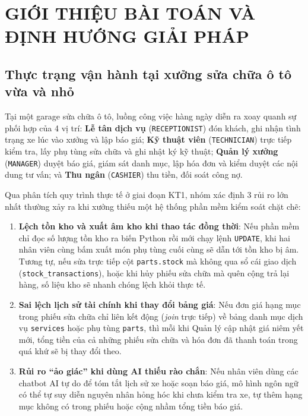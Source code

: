 \chapter{GIỚI THIỆU BÀI TOÁN VÀ ĐỊNH HƯỚNG GIẢI PHÁP}

\section{Thực trạng vận hành tại xưởng sửa chữa ô tô vừa và nhỏ}

Tại một garage sửa chữa ô tô, luồng công việc hàng ngày diễn ra xoay quanh sự phối hợp của 4 vị trí: \textbf{Lễ tân dịch vụ} (\texttt{RECEPTIONIST}) đón khách, ghi nhận tình trạng xe lúc vào xưởng và lập báo giá; \textbf{Kỹ thuật viên} (\texttt{TECHNICIAN}) trực tiếp kiểm tra, lấy phụ tùng sửa chữa và ghi nhật ký kỹ thuật; \textbf{Quản lý xưởng} (\texttt{MANAGER}) duyệt báo giá, giám sát danh mục, lập hóa đơn và kiểm duyệt các nội dung tư vấn; và \textbf{Thu ngân} (\texttt{CASHIER}) thu tiền, đối soát công nợ.

Qua phân tích quy trình thực tế ở giai đoạn KT1, nhóm xác định 3 rủi ro lớn nhất thường xảy ra khi xưởng thiếu một hệ thống phần mềm kiểm soát chặt chẽ:
\begin{enumerate}[noitemsep,topsep=2pt]
  \item \textbf{Lệch tồn kho và xuất âm kho khi thao tác đồng thời}: Nếu phần mềm chỉ đọc số lượng tồn kho ra biến Python rồi mới chạy lệnh \texttt{UPDATE}, khi hai nhân viên cùng bấm xuất món phụ tùng cuối cùng sẽ dẫn tới tồn kho bị âm. Tương tự, nếu sửa trực tiếp cột \texttt{parts.stock} mà không qua sổ cái giao dịch (\texttt{stock\_transactions}), hoặc khi hủy phiếu sửa chữa mà quên cộng trả lại hàng, số liệu kho sẽ nhanh chóng lệch khỏi thực tế.
  \item \textbf{Sai lệch lịch sử tài chính khi thay đổi bảng giá}: Nếu đơn giá hạng mục trong phiếu sửa chữa chỉ liên kết động (\textit{join} trực tiếp) về bảng danh mục dịch vụ \texttt{services} hoặc phụ tùng \texttt{parts}, thì mỗi khi Quản lý cập nhật giá niêm yết mới, tổng tiền của cả những phiếu sửa chữa và hóa đơn đã thanh toán trong quá khứ sẽ bị thay đổi theo.
  \item \textbf{Rủi ro “ảo giác” khi dùng AI thiếu rào chắn}: Nếu nhân viên dùng các chatbot AI tự do để tóm tắt lịch sử xe hoặc soạn báo giá, mô hình ngôn ngữ có thể tự suy diễn nguyên nhân hỏng hóc khi chưa kiểm tra xe, tự thêm hạng mục không có trong phiếu hoặc cộng nhầm tổng tiền báo giá.
\end{enumerate}

